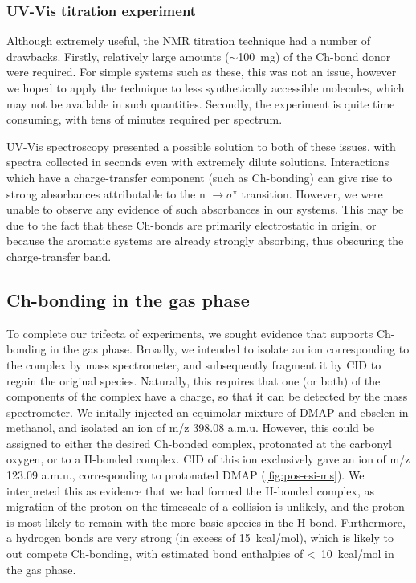 \begin{refsection}
\subsubsection{UV-Vis titration experiment}
Although extremely useful, the NMR titration technique had a number of drawbacks.
Firstly, relatively large amounts ($\sim$100~mg) of the Ch-bond donor were required.
For simple systems such as these, this was not an issue, however we hoped to apply the technique to less synthetically accessible molecules, which may not be available in such quantities.
Secondly, the experiment is quite time consuming, with tens of minutes required per spectrum.

UV-Vis spectroscopy presented a possible solution to both of these issues, with spectra collected in seconds even with extremely dilute solutions.
Interactions which have a charge-transfer component (such as Ch-bonding) can give rise to strong absorbances attributable to the n $\rightarrow \sigma^{\star}$ transition.\autocite{Blackstock1987}
However, we were unable to observe any evidence of such absorbances in our systems.
This may be due to the fact that these Ch-bonds are primarily electrostatic in origin, or because the aromatic systems are already strongly absorbing, thus obscuring the charge-transfer band.

\subsection{Ch-bonding in the gas phase}
To complete our trifecta of experiments, we sought evidence that supports Ch-bonding in the gas phase.
Broadly, we intended to isolate an ion corresponding to the complex by mass spectrometer, and subsequently fragment it by CID to regain the original species.
Naturally, this requires that one (or both) of the components of the complex have a charge, so that it can be detected by the mass spectrometer.
We initally injected an equimolar mixture of DMAP and ebselen  in methanol, and isolated an ion of m/z 398.08 a.m.u.
However, this could be assigned to either the desired Ch-bonded complex, protonated at the carbonyl oxygen, or to a H-bonded complex.
CID of this ion exclusively gave an ion of m/z 123.09 a.m.u., corresponding to protonated DMAP (\cref{fig:pos-esi-ms}).
We interpreted this as evidence that we had formed the H-bonded complex, as migration of the proton on the timescale of a collision is unlikely, and the proton is most likely to remain with the more basic species in the H-bond.
Furthermore, a  hydrogen bonds are very strong (in excess of 15~kcal/mol)\autocite{Emsley1980}, which is likely to out compete Ch-bonding, with estimated bond enthalpies of <~10~kcal/mol in the gas phase.


\end{refsection}
